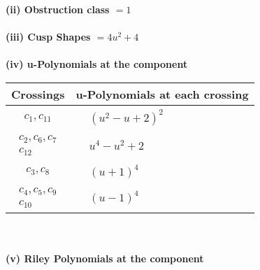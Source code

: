 \documentclass[1p]{elsarticle_modified}
\theoremstyle{definition}
\begin{document}
\flushleft \textbf{(ii) Obstruction class $= 1$}\\~\\
\flushleft \textbf{(iii) Cusp Shapes $= 4 u^2+4$}\\~\\
\newpage\renewcommand{\arraystretch}{1}
\flushleft \textbf{(iv) u-Polynomials at the component}\newline \\
\begin{tabular}{m{50pt}|m{274pt}}
Crossings & \hspace{64pt}u-Polynomials at each crossing \\
\hline $$\begin{aligned}c_{1},c_{11}\end{aligned}$$&$\begin{aligned}
&(u^2- u+2)^2
\end{aligned}$\\
\hline $$\begin{aligned}c_{2},c_{6},c_{7}\\c_{12}\end{aligned}$$&$\begin{aligned}
&u^4- u^2+2
\end{aligned}$\\
\hline $$\begin{aligned}c_{3},c_{8}\end{aligned}$$&$\begin{aligned}
&(u+1)^4
\end{aligned}$\\
\hline $$\begin{aligned}c_{4},c_{5},c_{9}\\c_{10}\end{aligned}$$&$\begin{aligned}
&(u-1)^4
\end{aligned}$\\
\hline
\end{tabular}\\~\\
\newpage\renewcommand{\arraystretch}{1}
\flushleft \textbf{(v) Riley Polynomials at the component}\newline \\
\end{document}
